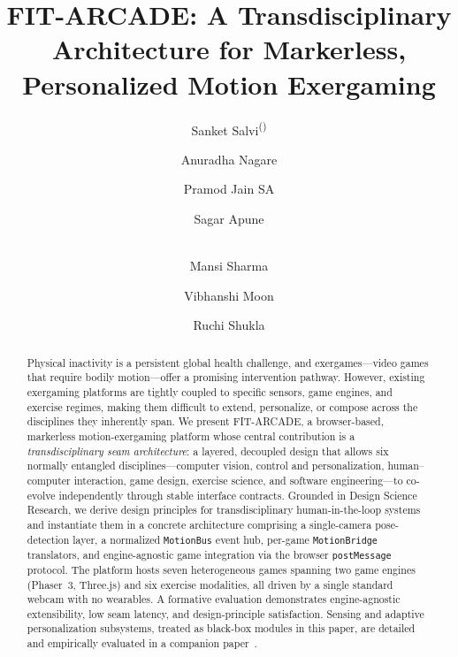 \documentclass[runningheads]{llncs}
\newcommand{\sys}{\textsc{FIT-ARCADE}}
\newcommand{\motionbus}{\texttt{MotionBus}}
\newcommand{\motionbridge}{\texttt{MotionBridge}}
\newcommand{\postmsg}{\texttt{postMessage}}
\newcommand{\citecompanion}{\cite{companion2026}}
\begin{document}
\title{FIT-ARCADE: A Transdisciplinary Architecture for Markerless, Personalized Motion Exergaming}

\author{%
  Sanket Salvi\textsuperscript{(\Letter)} \and
  Anuradha Nagare \and
  Pramod Jain SA \and
  Sagar Apune \and \\
  Mansi Sharma \and
  Vibhanshi Moon \and
  Ruchi Shukla%
}

\maketitle

\begin{abstract}
Physical inactivity is a persistent global health challenge, and exergames---video games
that require bodily motion---offer a promising intervention pathway. However, existing
exergaming platforms are tightly coupled to specific sensors, game engines, and exercise
regimes, making them difficult to extend, personalize, or compose across the disciplines
they inherently span. We present \sys{}, a browser-based, markerless motion-exergaming
platform whose central contribution is a \emph{transdisciplinary seam architecture}: a
layered, decoupled design that allows six normally entangled disciplines---computer vision,
control and personalization, human--computer interaction, game design, exercise science,
and software engineering---to co-evolve independently through stable interface contracts.
Grounded in Design Science Research, we derive design principles for transdisciplinary
human-in-the-loop systems and instantiate them in a concrete architecture comprising a
single-camera pose-detection layer, a normalized \motionbus{} event hub, per-game
\motionbridge{} translators, and engine-agnostic game integration via the browser
\postmsg{} protocol. The platform hosts seven heterogeneous games spanning two game
engines (Phaser~3, Three.js) and six exercise modalities, all driven by a single standard
webcam with no wearables. A formative evaluation demonstrates engine-agnostic
extensibility, low seam latency, and design-principle satisfaction. Sensing and adaptive
personalization subsystems, treated as black-box modules in this paper, are detailed and
empirically evaluated in a companion paper~\citecompanion{}.

\end{abstract}
\end{document}
